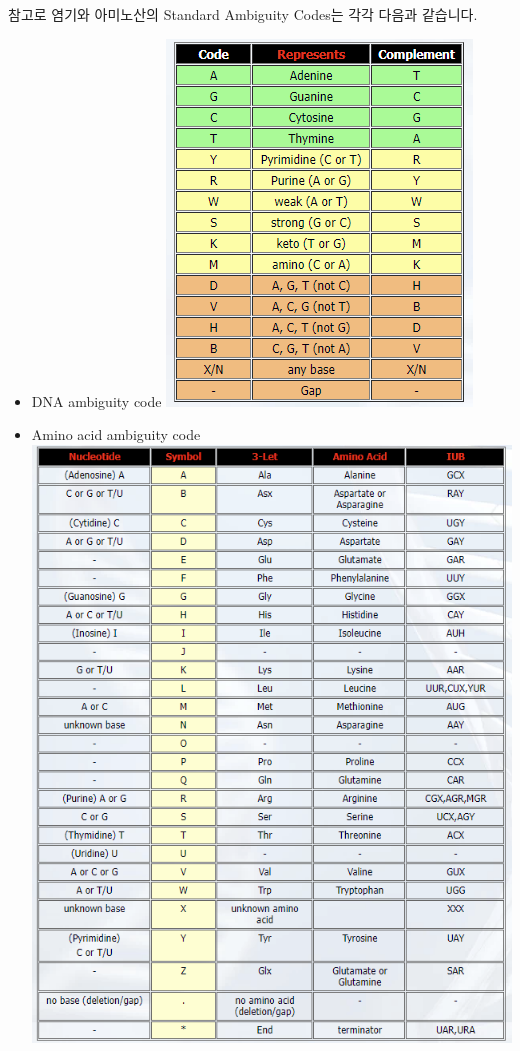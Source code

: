 \documentclass[
]{book}
\begin{document}
참고로 염기와 아미노산의 Standard Ambiguity Codes는 각각 다음과 같습니다.

\begin{itemize}
\item
  DNA ambiguity code
  \includegraphics{images/dnasscode.png}
\item
  Amino acid ambiguity code
  \includegraphics{images/aaacode.png}
\end{itemize}
\end{document}
